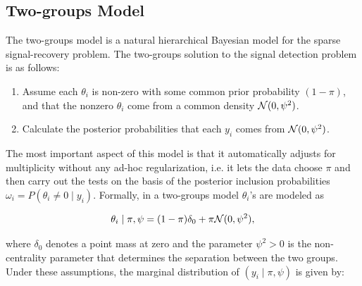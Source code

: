 \documentclass[sts,preprint]{imsart}
\begin{document}
\begin{appendix}





\section{Two-groups Model}\label{sec:2gp}

The two-groups model is a natural hierarchical Bayesian model for the sparse
signal-recovery problem.  The two-groups solution to the signal detection
problem is as follows:
\begin{enumerate}
\item Assume each $\theta_i$ is non-zero with some common prior probability $(1 - \pi)$, and that the nonzero $\theta_i$ come from a common density ${\cal N}(0,\psi^2)$. 
\item Calculate the posterior probabilities that each $y_i$ comes from ${\cal N}(0,\psi^2)$. 
\end{enumerate}
The most important aspect of this model is that it automatically adjusts for multiplicity without any ad-hoc regularization, i.e. it lets the data choose $\pi$ and then carry out the tests on the basis of the posterior inclusion probabilities $\omega_i = P(\theta_i \neq 0 \mid y_i)$. Formally, in a two-groups model $\theta_i$'s are modeled as

\begin{equation}
\theta_i \mid \pi, \psi = (1-\pi)\delta_{0} + \pi {\cal N} (0, \psi^2), \label{spikeslab}
\end{equation}

where $\delta_{0}$ denotes a point mass at zero and the parameter $\psi^2>0$ is
the non-centrality parameter that determines the separation between the two
groups. Under these assumptions, the marginal distribution of $(y_i \mid \pi, \psi)$
is given by:


\end{appendix}
\end{document}
